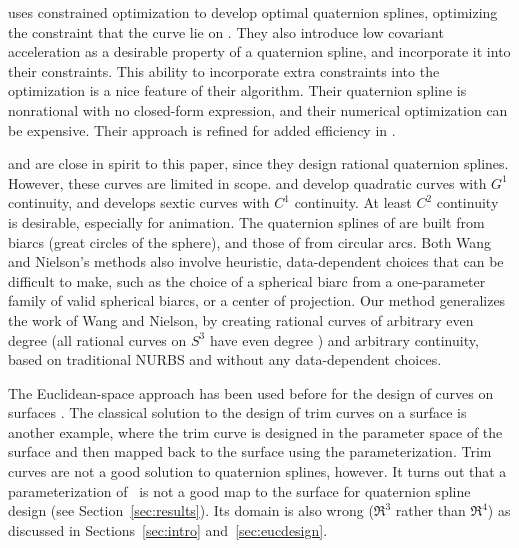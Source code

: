 \documentclass[12pt]{article}
\begin{document}
\cite{barr92} uses constrained optimization to develop optimal
quaternion splines, optimizing the constraint that the curve lie on .
They also introduce low covariant acceleration
as a desirable property of a quaternion spline,
and incorporate it into their constraints.
This ability to incorporate extra constraints into the optimization
is a nice feature of their algorithm.
Their quaternion spline is nonrational with no closed-form expression,
and their numerical optimization can be expensive.
Their approach is refined for added efficiency in \cite{rama97}.

\cite{wang93, wang94} and \cite{nielson93} are close in spirit 
to this paper, since they design rational quaternion splines.
However, these curves are limited in scope.
\cite{wang93,wang94} and \cite{nielson93} develop quadratic curves
with $G^1$ continuity, and \cite{wang94} develops sextic curves
with $C^1$ continuity.
At least $C^2$ continuity is desirable, especially for animation.
The quaternion splines of \cite{wang93} are built from biarcs 
(great circles of the sphere), and those of \cite{nielson93} from circular arcs.
Both Wang and Nielson's methods also involve heuristic, data-dependent choices
that can be difficult to make,
such as the choice of a spherical biarc from
a one-parameter family of valid spherical biarcs, or a center of projection.
Our method generalizes the work of Wang and Nielson, 
by creating rational curves of arbitrary even degree 
(all rational curves on $S^3$ have even degree \cite{wang94}) 
and arbitrary continuity,
based on traditional NURBS and without any data-dependent choices.

The Euclidean-space approach has been used before
for the design of curves on surfaces \cite{dietz93,wang94}.
The classical solution to the design of trim curves on a surface 
is another example, where the trim curve is designed in the parameter space 
of the surface and then mapped back to the surface using the
parameterization. %
Trim curves are not a good solution to quaternion splines, however.
It turns out that a parameterization of \ is not a good map
to the surface for quaternion spline design (see Section~\ref{sec:results}).
Its domain is also wrong ($\Re^3$ rather than $\Re^4$) as discussed
in Sections~\ref{sec:intro} and~\ref{sec:eucdesign}.
\end{document}

